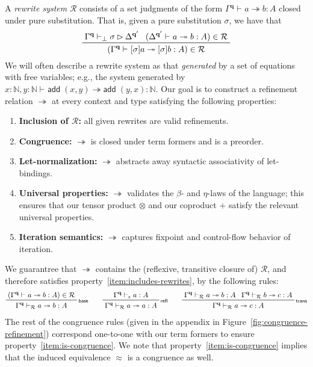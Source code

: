 \documentclass[acmsmall,screen,review]{acmart}
\newcommand{\mc}[1]{\ensuremath{\mathcal{#1}}}
\newcommand{\mb}[1]{\ensuremath{\mathbf{#1}}}
\newcommand{\ms}[1]{\ensuremath{\mathsf{#1}}}
\newcommand{\nats}{\mathbb{N}}
\newcommand{\rle}[1]{{\scriptsize\textsf{#1}}}
\newcommand{\hasty}[4]{#1 \vdash_{#2} #3: {#4}}
\newcommand{\issubst}[4]{#1 \vdash_{#2} #3 \rhd #4}
\newcommand{\tref}{\twoheadrightarrow}
\newcommand{\tmle}[5]{#1 \vdash_{#2} #3 \tref #4 : {#5}}
\begin{document}
A \emph{rewrite system} $\mc{R}$ consists of a set judgments of the form
$\tmle{\Gamma^{\mb{q}}}{}{a}{b}{A}$ closed under pure substitution. That is, given a pure
substitution $\sigma$, we have that
\begin{equation*}
  \prftree[r]{}
    {\issubst{\Gamma^{\mb{q}}}{\bot}{\sigma}{\Delta^{\mb{q}'}}}
    {(\tmle{\Delta^{\mb{q}'}}{}{a}{b}{A}) \in \mc{R}}
    {(\tmle{\Gamma^{\mb{q}}}{}{[\sigma]a}{[\sigma]b}{A}) \in \mc{R}} 
\end{equation*}
We will often describe a rewrite system as that \emph{generated} by a set of equations with free
variables; e.g., the system generated by $\tmle{x : \nats, y : \nats}{}{\ms{add}\;(x,
y)}{\ms{add}\;(y, x)}{\nats}$. Our goal is to construct a refinement relation $\tref$ at every
context and type satisfying the following properties: 
\begin{enumerate}
  \item \textbf{Inclusion of $\mc{R}$:} all given rewrites are valid refinements.
  \label{item:includes-rewrites}
  \item \textbf{Congruence:} $\tref$ is closed under term formers and is a preorder.
  \label{item:is-congruence}
  \item \textbf{Let-normalization:} $\tref$ abstracts away syntactic associativity of let-bindings.
  \label{item:abstracts-syntax}
  \item \textbf{Universal properties:} $\tref$ validates the $\beta$- and $\eta$-laws of the
  language; this ensures that our tensor product $\otimes$ and our coproduct $+$ satisfy the
  relevant universal properties.
  \label{item:does-computation}
  \item \textbf{Iteration semantics:} $\tref$ captures fixpoint and control-flow behavior of
  iteration.
  \label{item:does-iteration}
\end{enumerate}
We guarantree that $\tref$ contains the (reflexive, transitive closure of) $\mc{R}$, and therefore
satisfies property~\ref{item:includes-rewrites}, by the following rules:
\begin{gather*}
  \prftree[r]{\rle{base}}
    {(\tmle{\Gamma^{\mb{q}}}{}{a}{b}{A}) \in \mc{R}}
    {\tmle{\Gamma^{\mb{q}}}{\mc{R}}{a}{b}{A}} \qquad
  \prftree[r]{\rle{refl}}
    {\hasty{\Gamma^{\mb{q}}}{\epsilon}{a}{A}}
    {\tmle{\Gamma^{\mb{q}}}{\mc{R}}{a}{a}{A}}
  \qquad
  \prftree[r]{\rle{trans}}
    {\tmle{\Gamma^{\mb{q}}}{\mc{R}}{a}{b}{A}}
    {\tmle{\Gamma^{\mb{q}}}{\mc{R}}{b}{c}{A}}
    {\tmle{\Gamma^{\mb{q}}}{\mc{R}}{a}{c}{A}}
\end{gather*}
The rest of the congruence rules (given in the appendix in Figure~\ref{fig:congruence-refinement})
correspond one-to-one with our term formers to ensure property~\ref{item:is-congruence}. We note
that property~\ref{item:is-congruence} implies that the induced equivalence $\approx$ is a
congruence as well.
\end{document}
